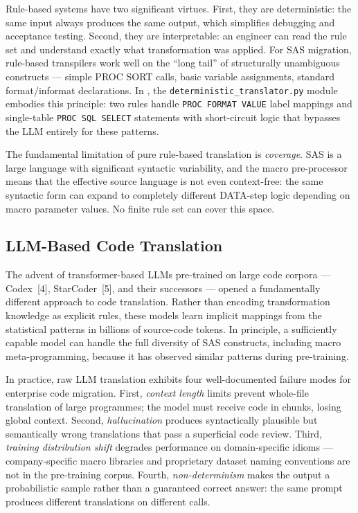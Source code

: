 Rule-based systems have two significant virtues. First, they are deterministic:
the same input always produces the same output, which simplifies debugging and
acceptance testing. Second, they are interpretable: an engineer can read the
rule set and understand exactly what transformation was applied. For SAS
migration, rule-based transpilers work well on the ``long tail'' of structurally
unambiguous constructs --- simple PROC SORT calls, basic variable assignments,
standard format/informat declarations. In \codara{}, the
\texttt{deterministic\_translator.py} module embodies this principle: two rules
handle \texttt{PROC FORMAT VALUE} label mappings and single-table
\texttt{PROC SQL SELECT} statements with short-circuit logic that bypasses the
\ac{LLM} entirely for these patterns.

The fundamental limitation of pure rule-based translation is \emph{coverage}.
SAS is a large language with significant syntactic variability, and the macro
pre-processor means that the effective source language is not even context-free:
the same syntactic form can expand to completely different DATA-step logic
depending on macro parameter values. No finite rule set can cover this space.

\subsection{LLM-Based Code Translation}
\label{subsec:llm-translation}

The advent of transformer-based \acp{LLM} pre-trained on large code corpora ---
Codex~[4], StarCoder~[5], and their successors --- opened a fundamentally
different approach to code translation. Rather than encoding transformation
knowledge as explicit rules, these models learn implicit mappings from the
statistical patterns in billions of source-code tokens. In principle, a
sufficiently capable model can handle the full diversity of SAS constructs,
including macro meta-programming, because it has observed similar patterns
during pre-training.

In practice, raw \ac{LLM} translation exhibits four well-documented failure
modes for enterprise code migration. First, \emph{context length} limits
prevent whole-file translation of large programmes; the model must receive
code in chunks, losing global context. Second, \emph{hallucination} produces
syntactically plausible but semantically wrong translations that pass a
superficial code review. Third, \emph{training distribution shift} degrades
performance on domain-specific idioms --- company-specific macro libraries and
proprietary dataset naming conventions are not in the pre-training corpus.
Fourth, \emph{non-determinism} makes the output a probabilistic sample rather
than a guaranteed correct answer: the same prompt produces different translations
on different calls.

